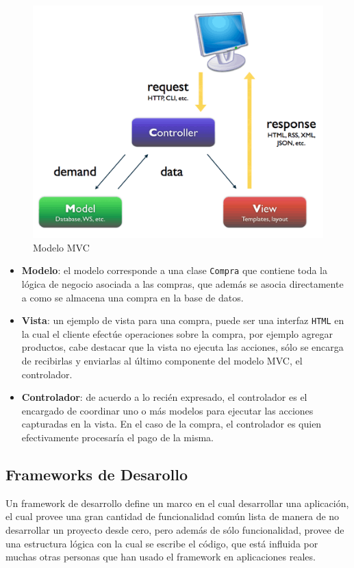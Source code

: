 \begin{figure}[!h]
  \centering
  \includegraphics[scale=.5]{images/mvc.png}
  \caption{Modelo MVC}
  \label{modelomvc}
\end{figure}

\begin{itemize}
  \item \textbf{Modelo}: el modelo corresponde a una clase \texttt{Compra} que contiene toda la lógica de negocio asociada a las compras, que además se asocia directamente a como se almacena una compra en la base de datos.
  \item \textbf{Vista}: un ejemplo de vista para una compra, puede ser una interfaz \texttt{HTML} en la cual el cliente efectúe operaciones sobre la compra, por ejemplo agregar productos, cabe destacar que la vista no ejecuta las acciones, sólo se encarga de recibirlas y enviarlas al último componente del modelo MVC, el controlador.
  \item \textbf{Controlador}: de acuerdo a lo recién expresado, el controlador es el encargado de coordinar uno o más modelos para ejecutar las acciones capturadas en la vista. En el caso de la compra, el controlador es quien efectivamente procesaría el pago de la misma.
\end{itemize}

\subsection{Frameworks de Desarollo} %
\label{sub:frameworks_de_desarollo}
Un framework de desarrollo define un marco en el cual desarrollar una aplicación, el cual provee una gran cantidad de funcionalidad común lista de manera de no desarrollar un proyecto desde cero, pero además de sólo funcionalidad, provee de una estructura lógica con la cual se escribe el código, que está influida por muchas otras personas que han usado el framework en aplicaciones reales.

